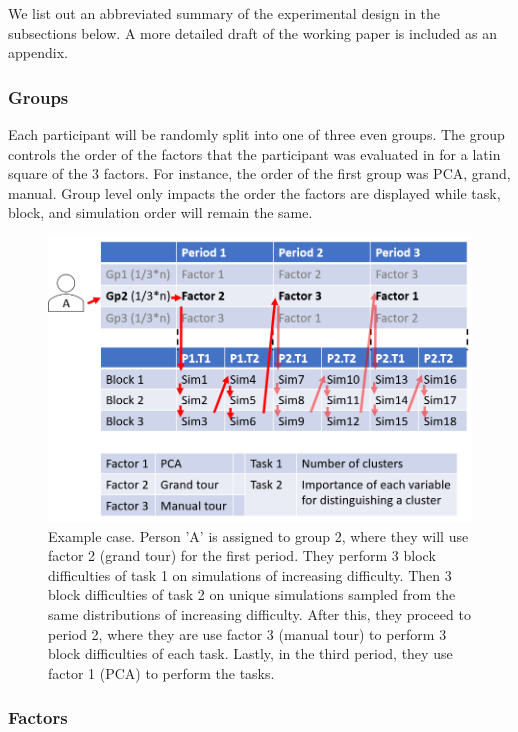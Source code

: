 \documentclass[
  11,
]{article}
\begin{document}
We list out an abbreviated summary of the experimental design in the subsections below. A more detailed draft of the working paper is included as an appendix.

\hypertarget{sec:groups}{%
\subsubsection{Groups}\label{sec:groups}}

Each participant will be randomly split into one of three even groups. The group controls the order of the factors that the participant was evaluated in for a latin square of the 3 factors. For instance, the order of the first group was PCA, grand, manual. Group level only impacts the order the factors are displayed while task, block, and simulation order will remain the same.

\begin{figure}[h]

{\centering \includegraphics[width=0.8\linewidth,]{./figures/experimental_design_personA} 

}

\caption{Example case. Person 'A' is assigned to group 2, where they will use factor 2 (grand tour) for the first period. They perform 3 block difficulties of task 1 on simulations of increasing difficulty. Then 3 block difficulties of task 2 on unique simulations sampled from the same distributions of increasing difficulty. After this, they proceed to period 2, where they are use factor 3 (manual tour) to perform 3 block difficulties of each task. Lastly, in the third period, they use factor 1 (PCA) to perform the tasks.}\label{fig:designExample}
\end{figure}

\hypertarget{sec:factors}{%
\subsubsection{Factors}\label{sec:factors}}
\end{document}
